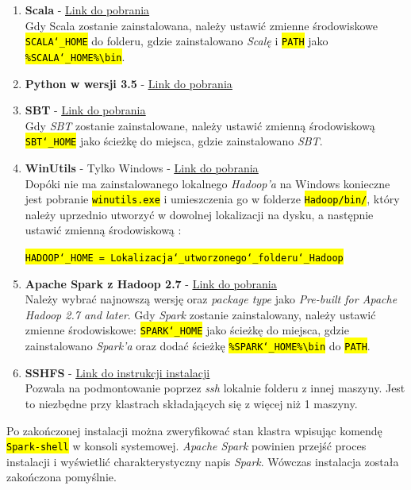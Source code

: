 \documentclass[a4paper,onecolumn,oneside,12pt]{memoir}
\begin{document}
{{\begin{enumerate}
\item {
\textbf{Scala} - \underline{\href{http://www.scala-lang.org/download/}{Link do pobrania}}  \\
Gdy Scala zostanie zainstalowana, należy ustawić zmienne środowiskowe \texttt{\hl{SCALA{\char`_}HOME}} do folderu, gdzie zainstalowano \textit{Scalę} i \texttt{\hl{PATH}} jako \texttt{\hl{\%SCALA{\char`_}HOME\%\textbackslash bin}}.
}
\\
\item {
\textbf{Python w wersji 3.5} - \underline{\href{https://www.python.org/downloads/windows/}{Link do pobrania}}  
}
\\
\item {
\textbf{SBT} - \underline{\href{http://www.scala-sbt.org/download.html}{Link do pobrania}}  \\
Gdy \textit{SBT} zostanie zainstalowane, należy ustawić zmienną środowiskową  \texttt{\hl{SBT{\char`_}HOME}} jako ścieżkę do miejsca, gdzie zainstalowano \textit{SBT}.
}
\\
\item {
\textbf{WinUtils} - Tylko Windows - \underline{\href{http://public-repo-1.hortonworks.com/hdp-win-alpha/winutils.exe}{Link do pobrania}}  \\
Dopóki nie ma zainstalowanego lokalnego \textit{Hadoop’a} na Windows konieczne jest pobranie \texttt{\hl{winutils.exe}} i umieszczenia go w folderze \texttt{\hl{Hadoop/bin/}}, który należy uprzednio utworzyć w dowolnej lokalizacji na dysku, a następnie ustawić zmienną środowiskową :

\centerline{\texttt{\hl{HADOOP{\char`_}HOME = Lokalizacja{\char`_}utworzonego{\char`_}folderu{\char`_}Hadoop}}}
}

\vspace{6mm}
\item {
\textbf{Apache Spark z Hadoop 2.7} - \underline{\href{http://spark.apache.org/downloads.html}{Link do pobrania}}  \\
Należy wybrać najnowszą wersję oraz \textit{package type} jako \textit{Pre-built for Apache Hadoop 2.7 and later}. Gdy \textit{Spark} zostanie zainstalowany, należy ustawić zmienne środowiskowe: \texttt{\hl{SPARK{\char`_}HOME}} jako ścieżkę do miejsca, gdzie zainstalowano \textit{Spark’a} oraz dodać ścieżkę \texttt{\hl{\%SPARK{\char`_}HOME\%\textbackslash bin}} do \texttt{\hl{PATH}}.
}

\vspace{6mm}
\item {
\textbf{SSHFS} - \underline{\href{https://www.digitalocean.com/community/tutorials/how-to-use-sshfs-to-mount-remote-file-systems-over-ssh}{Link do instrukcji instalacji}} \\
Pozwala na podmontowanie poprzez \textit{ssh} lokalnie folderu z innej maszyny.
Jest to niezbędne przy klastrach składających się z więcej niż 1 maszyny.
}
\end{enumerate}
\vspace{6mm}
Po zakończonej instalacji można zweryfikować stan klastra wpisując komendę
{\texttt{\hl{Spark-shell}}} w konsoli systemowej. \textit{Apache Spark} powinien przejść proces instalacji i wyświetlić
charakterystyczny napis \textit{Spark}. Wówczas instalacja została zakończona pomyślnie.

}}
\end{document}
